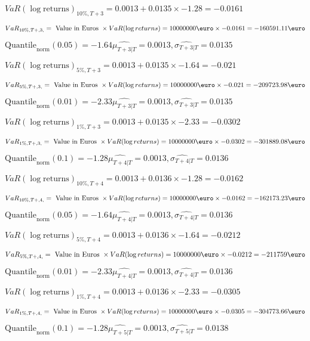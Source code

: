 $VaR(\log \text{returns})_{10\%, T + 3} = 0.0013 + 0.0135\times-1.28 = -0.0161$

$VaR_{10\%, T + ,3,} = \text{ Value in Euros } \times VaR(\log returns) = 10 000 000 \text{\euro} \times-0.0161 = -160591.11 \text{\euro}$


$\text{Quantile}_\text{norm}(0.05) = -1.64$$\hat{\mu_{T+3|T}} = 0.0013, \hat{\sigma_{T+3|T}} = 0.0135$

$VaR(\log \text{returns})_{5\%, T + 3} = 0.0013 + 0.0135\times-1.64 = -0.021$

$VaR_{5\%, T + ,3,} = \text{ Value in Euros } \times VaR(\log returns) = 10 000 000 \text{\euro} \times-0.021 = -209723.98 \text{\euro}$


$\text{Quantile}_\text{norm}(0.01) = -2.33$$\hat{\mu_{T+3|T}} = 0.0013, \hat{\sigma_{T+3|T}} = 0.0135$

$VaR(\log \text{returns})_{1\%, T + 3} = 0.0013 + 0.0135\times-2.33 = -0.0302$

$VaR_{1\%, T + ,3,} = \text{ Value in Euros } \times VaR(\log returns) = 10 000 000 \text{\euro} \times-0.0302 = -301889.08 \text{\euro}$


$\text{Quantile}_\text{norm}(0.1) = -1.28$$\hat{\mu_{T+4|T}} = 0.0013, \hat{\sigma_{T+4|T}} = 0.0136$

$VaR(\log \text{returns})_{10\%, T + 4} = 0.0013 + 0.0136\times-1.28 = -0.0162$

$VaR_{10\%, T + ,4,} = \text{ Value in Euros } \times VaR(\log returns) = 10 000 000 \text{\euro} \times-0.0162 = -162173.23 \text{\euro}$


$\text{Quantile}_\text{norm}(0.05) = -1.64$$\hat{\mu_{T+4|T}} = 0.0013, \hat{\sigma_{T+4|T}} = 0.0136$

$VaR(\log \text{returns})_{5\%, T + 4} = 0.0013 + 0.0136\times-1.64 = -0.0212$

$VaR_{5\%, T + ,4,} = \text{ Value in Euros } \times VaR(\log returns) = 10 000 000 \text{\euro} \times-0.0212 = -211759 \text{\euro}$


$\text{Quantile}_\text{norm}(0.01) = -2.33$$\hat{\mu_{T+4|T}} = 0.0013, \hat{\sigma_{T+4|T}} = 0.0136$

$VaR(\log \text{returns})_{1\%, T + 4} = 0.0013 + 0.0136\times-2.33 = -0.0305$

$VaR_{1\%, T + ,4,} = \text{ Value in Euros } \times VaR(\log returns) = 10 000 000 \text{\euro} \times-0.0305 = -304773.66 \text{\euro}$


$\text{Quantile}_\text{norm}(0.1) = -1.28$$\hat{\mu_{T+5|T}} = 0.0013, \hat{\sigma_{T+5|T}} = 0.0138$

